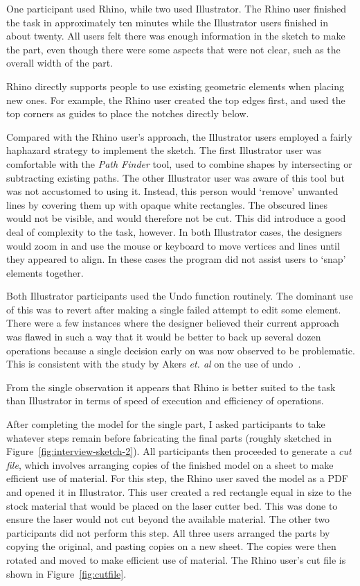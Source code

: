 \documentclass[12pt]{article}
\begin{document}
One participant used Rhino, while two used Illustrator. The Rhino user
finished the task in approximately ten minutes while the Illustrator
users finished in about twenty. All users felt there was enough
information in the sketch to make the part, even though there were
some aspects that were not clear, such as the overall width of the
part. 

Rhino directly supports people to use existing geometric elements when
placing new ones. For example, the Rhino user created the top edges
first, and used the top corners as guides to place the notches
directly below. 

Compared with the Rhino user's approach, the Illustrator users
employed a fairly haphazard strategy to implement the sketch. The
first Illustrator user was comfortable with the \textit{Path Finder}
tool, used to combine shapes by intersecting or subtracting existing
paths. The other Illustrator user was aware of this tool but was not
accustomed to using it. Instead, this person would `remove' unwanted
lines by covering them up with opaque white rectangles. The obscured
lines would not be visible, and would therefore not be cut. This did
introduce a good deal of complexity to the task, however. In both
Illustrator cases, the designers would zoom in and use the mouse or
keyboard to move vertices and lines until they appeared to align. In
these cases the program did not assist users to `snap' elements
together.

Both Illustrator participants used the Undo function routinely. The
dominant use of this was to revert after making a single failed
attempt to edit some element. There were a few instances where the
designer believed their current approach was flawed in such a way that
it would be better to back up several dozen operations because a
single decision early on was now observed to be problematic. This is
consistent with the study by Akers \textit{et. al} on the use of
undo~\cite{akers-undo}.

From the single observation it appears that Rhino is better suited to
the task than Illustrator in terms of speed of execution and
efficiency of operations.

After completing the model for the single part, I asked participants
to take whatever steps remain before fabricating the final parts
(roughly sketched in Figure~\ref{fig:interview-sketch-2}). All
participants then proceeded to generate a \textit{cut file}, which
involves arranging copies of the finished model on a sheet to make
efficient use of material. For this step, the Rhino user saved the
model as a PDF and opened it in Illustrator. This user created a red
rectangle equal in size to the stock material that would be placed on
the laser cutter bed. This was done to ensure the laser would not cut
beyond the available material. The other two participants did not
perform this step. All three users arranged the parts by copying the
original, and pasting copies on a new sheet. The copies were then
rotated and moved to make efficient use of material. The Rhino user's
cut file is shown in Figure~\ref{fig:cutfile}.
\end{document}
